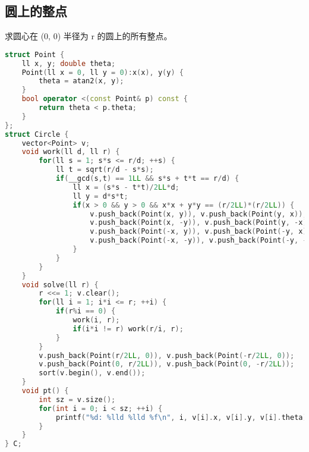 \subsection{圆上的整点}

求圆心在 (0, 0) 半径为 r 的圆上的所有整点。

\begin{lstlisting}[language=C++]
struct Point {
    ll x, y; double theta;
    Point(ll x = 0, ll y = 0):x(x), y(y) {
        theta = atan2(x, y);
    }
    bool operator <(const Point& p) const {
        return theta < p.theta;
    }
};
struct Circle {
    vector<Point> v;
    void work(ll d, ll r) {
        for(ll s = 1; s*s <= r/d; ++s) {
            ll t = sqrt(r/d - s*s);
            if(__gcd(s,t) == 1LL && s*s + t*t == r/d) {
                ll x = (s*s - t*t)/2LL*d;
                ll y = d*s*t;
                if(x > 0 && y > 0 && x*x + y*y == (r/2LL)*(r/2LL)) {
                    v.push_back(Point(x, y)), v.push_back(Point(y, x));
                    v.push_back(Point(x, -y)), v.push_back(Point(y, -x));
                    v.push_back(Point(-x, y)), v.push_back(Point(-y, x));
                    v.push_back(Point(-x, -y)), v.push_back(Point(-y, -x));
                }
            }
        }
    }
    void solve(ll r) {
        r <<= 1; v.clear();
        for(ll i = 1; i*i <= r; ++i) {
            if(r%i == 0) {
                work(i, r);
                if(i*i != r) work(r/i, r);
            }
        }
        v.push_back(Point(r/2LL, 0)), v.push_back(Point(-r/2LL, 0));
        v.push_back(Point(0, r/2LL)), v.push_back(Point(0, -r/2LL));
        sort(v.begin(), v.end());
    }
    void pt() {
        int sz = v.size();
        for(int i = 0; i < sz; ++i) {
            printf("%d: %lld %lld %f\n", i, v[i].x, v[i].y, v[i].theta);
        }
    }
} C;
\end{lstlisting}